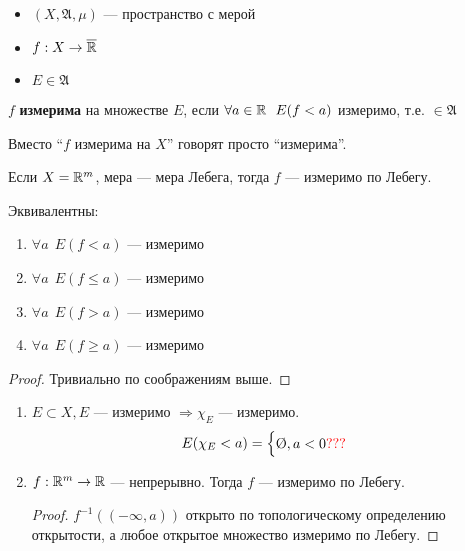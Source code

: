 \begin{definition}\itemfix
    \begin{itemize}
        \item \((X, \mathfrak{A}, \mu)\) --- пространство с мерой
        \item \(f : X \to \overline {\mathbb{R}}\)
        \item \(E\in \mathfrak{A}\)
    \end{itemize}

    \(f\) \textbf{измерима} на множестве \(E\), если \(\forall a\in\mathbb{R} \ \ E(f < a)\) измеримо, т.е. \(\in \mathfrak{A}\)
\end{definition}

Вместо ``\(f\) измерима на \(X\)'' говорят просто ``измерима''.

Если \(X = \mathbb{R}^m\), мера --- мера Лебега, тогда \(f\) --- измеримо по Лебегу.

\begin{remark}
    Эквивалентны:
    \begin{enumerate}
        \item \(\forall a \ \ E(f < a)\) --- измеримо
        \item \(\forall a \ \ E(f \leq a)\) --- измеримо
        \item \(\forall a \ \ E(f > a)\) --- измеримо
        \item \(\forall a \ \ E(f \geq a)\) --- измеримо
    \end{enumerate}
\end{remark}

\begin{proof}
    Тривиально по соображениям выше.
\end{proof}

\begin{example}\itemfix
    \begin{enumerate}
        \item \(E\subset X, E\) --- измеримо \( \Rightarrow \chi_E\) --- измеримо.
              \[E(\chi_E < a) = \begin{cases}
                      \text{\O}, a < 0
                      \?
                  \end{cases}\]
        \item \(f:\mathbb{R}^m \to \mathbb{R}\) --- непрерывно. Тогда \(f\) --- измеримо по Лебегу.
              \begin{proof}
                  \(f^{ - 1}(( -\infty, a))\) открыто по топологическому определению открытости, а любое открытое множество измеримо по Лебегу.
              \end{proof}
    \end{enumerate}
\end{example}

